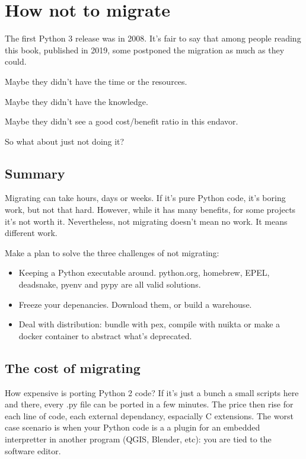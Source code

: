 \chapter{How not to migrate}

The first Python 3 release was in 2008. It's fair to say that among people reading this book, published in 2019, some postponed the migration as much as they could.

Maybe they didn't have the time or the resources.

Maybe they didn't have the knowledge.

Maybe they didn't see a good cost/benefit ratio in this endavor.

So what about just not doing it?


\section{Summary}

Migrating can take hours, days or weeks. If it's pure Python code, it's boring work, but not that hard. However, while it has many benefits, for some projects it's not worth it. Nevertheless, not migrating doesn't mean no work. It means different work.

Make a plan to solve the three challenges of not migrating:

\begin{itemize}
    \item Keeping a Python executable around. python.org, homebrew, EPEL, deadsnake, pyenv and pypy are all valid solutions.
    \item Freeze your depenancies. Download them, or build a warehouse.
    \item Deal with distribution: bundle with pex, compile with nuikta or make a docker container to abstract what's deprecated.
\end{itemize}

\section{The cost of migrating}

How expensive is porting Python 2 code? If it's just a bunch a small scripts here and there, every .py file can be ported in a few minutes. The price then rise for each line of code, each external dependancy, espacially C extensions. The worst case scenario is when your Python code is a a plugin for an embedded interpretter in another program (QGIS, Blender, etc): you are tied to the software editor.

